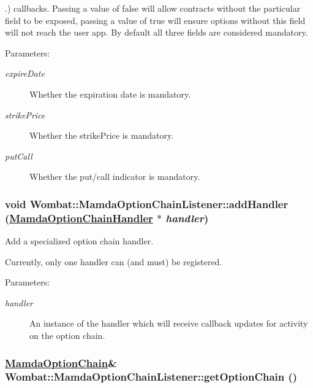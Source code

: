 .) callbacks. Passing a value of false will allow contracts without the particular field to be exposed, passing a value of true will ensure options without this field will not reach the user app. By default all three fields are considered mandatory.

\begin{Desc}
\item[Parameters:]
\begin{description}
\item[{\em expire\-Date}]Whether the expiration date is mandatory. \item[{\em strike\-Price}]Whether the strike\-Price is mandatory. \item[{\em put\-Call}]Whether the put/call indicator is mandatory. \end{description}
\end{Desc}
\hypertarget{classWombat_1_1MamdaOptionChainListener_1f3d13c81de522368bf30257965e87ea}{
\subsubsection[addHandler]{\setlength{\rightskip}{0pt plus 5cm}void Wombat::Mamda\-Option\-Chain\-Listener::add\-Handler (\hyperlink{classWombat_1_1MamdaOptionChainHandler}{Mamda\-Option\-Chain\-Handler} $\ast$ {\em handler})}}
\label{classWombat_1_1MamdaOptionChainListener_1f3d13c81de522368bf30257965e87ea}


Add a specialized option chain handler. 

Currently, only one handler can (and must) be registered.

\begin{Desc}
\item[Parameters:]
\begin{description}
\item[{\em handler}]An instance of the handler which will receive callback updates for activity on the option chain. \end{description}
\end{Desc}
\hypertarget{classWombat_1_1MamdaOptionChainListener_0cf73723053cf9ba983f7a156d2fa1ae}{
\subsubsection[getOptionChain]{\setlength{\rightskip}{0pt plus 5cm}\hyperlink{classWombat_1_1MamdaOptionChain}{Mamda\-Option\-Chain}\& Wombat::Mamda\-Option\-Chain\-Listener::get\-Option\-Chain ()}}
\label{classWombat_1_1MamdaOptionChainListener_0cf73723053cf9ba983f7a156d2fa1ae}


